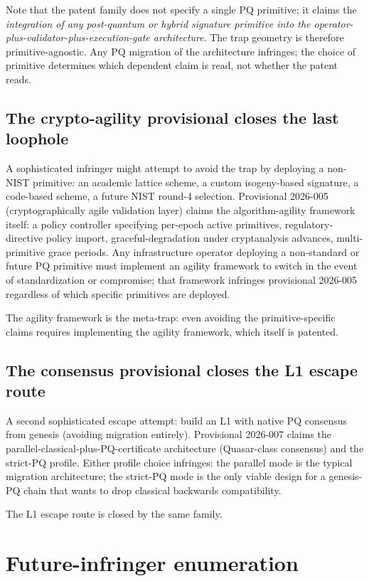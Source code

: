 \documentclass[11pt,letterpaper]{article}
\begin{document}
Note that the patent family does not specify a single PQ primitive; it claims the \emph{integration of any post-quantum or hybrid signature primitive into the operator-plus-validator-plus-execution-gate architecture}. The trap geometry is therefore primitive-agnostic. Any PQ migration of the architecture infringes; the choice of primitive determines which dependent claim is read, not whether the patent reads.

\subsection{The crypto-agility provisional closes the last loophole}

A sophisticated infringer might attempt to avoid the trap by deploying a non-NIST primitive: an academic lattice scheme, a custom isogeny-based signature, a code-based scheme, a future NIST round-4 selection. Provisional 2026-005 (cryptographically agile validation layer) claims the algorithm-agility framework itself: a policy controller specifying per-epoch active primitives, regulatory-directive policy import, graceful-degradation under cryptanalysis advances, multi-primitive grace periods. Any infrastructure operator deploying a non-standard or future PQ primitive must implement an agility framework to switch in the event of standardization or compromise; that framework infringes provisional 2026-005 regardless of which specific primitives are deployed.

The agility framework is the meta-trap: even avoiding the primitive-specific claims requires implementing the agility framework, which itself is patented.

\subsection{The consensus provisional closes the L1 escape route}

A second sophisticated escape attempt: build an L1 with native PQ consensus from genesis (avoiding migration entirely). Provisional 2026-007 claims the parallel-classical-plus-PQ-certificate architecture (Quasar-class consensus) and the strict-PQ profile. Either profile choice infringes: the parallel mode is the typical migration architecture; the strict-PQ mode is the only viable design for a genesis-PQ chain that wants to drop classical backwards compatibility.

The L1 escape route is closed by the same family.

\section{Future-infringer enumeration}
\end{document}
